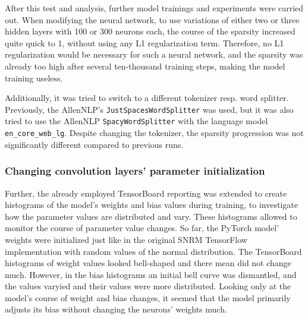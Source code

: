 After this test and analysis, further model trainings and experiments were carried out.
When modifying the neural network, to use variations of either two or three hidden layers 
    with 100 or 300 neurons each, 
    the course of the sparsity increased quite quick to 1, without using any L1 
    regularization term.
Therefore, no L1 regularization would be necessary for such a neural network,
    and the sparsity was already too high after several ten-thousand training steps,
    making the model training useless.

Additionally, it was tried to switch to a different tokenizer resp. word splitter.
Previously, the AllenNLP's \texttt{JustSpacesWordSplitter} was used,
    but it was also tried to use the AllenNLP \texttt{SpacyWordSplitter} with the 
    language model \texttt{en\_core\_web\_lg}.
Despite changing the tokenizer, the sparsity progression was not significantly different
    compared to previous runs.

\subsubsection*{Changing convolution layers' parameter initialization}
Further, the already employed TensorBoard reporting was extended to create histograms
    of the model's weights and bias values during training, to investigate how the parameter
    values are distributed and vary.
These histograms allowed to monitor the course of parameter value changes.
So far, the PyTorch model' weights were initialized just like in the original SNRM TensorFlow
    implementation with random values of the normal distribution.
The TensorBoard histograms of weight values looked bell-shaped and there mean did not change much.
However, in the bias histograms an initial bell curve was dismantled, and the values 
    varyied and their values were more distributed.
Looking only at the model's course of weight and bias changes, it seemed that the model
    primarily adjusts its bias without changing the neurons' weights much.

